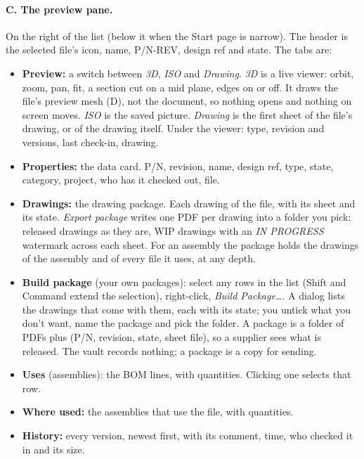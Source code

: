 \paragraph{C. The preview pane.} On the right of the list (below it when the Start page is narrow). The header is the
selected file's icon, name, P/N-REV, design ref and state. The tabs are:
\begin{itemize}[nosep]
  \item \textbf{Preview:} a switch between \emph{3D}, \emph{ISO} and \emph{Drawing}.
        \emph{3D} is a live viewer: orbit, zoom, pan, fit, a section cut on a mid plane, edges on or off. It draws
        the file's preview mesh (D), not the document, so nothing opens and nothing on screen moves. \emph{ISO} is the
        saved picture. \emph{Drawing} is the first sheet of the file's drawing, or of the drawing itself.
        Under the viewer: type, revision and versions, last check-in, drawing.
  \item \textbf{Properties:} the data card. P/N, revision, name, design ref, type, state, category, project, who
        has it checked out, file.
  \item \textbf{Drawings:} the drawing package. Each drawing of the file, with its sheet and its state. \emph{Export
        package} writes one PDF per drawing into a folder you pick: released drawings as they are, WIP drawings with an
        \emph{IN PROGRESS} watermark across each sheet. For an assembly the package holds the drawings of the assembly
        and of every file it uses, at any depth.
  \item \textbf{Build package} (your own packages): select any rows in the list (Shift and Command extend the
        selection), right-click, \emph{Build Package\ldots}. A dialog lists the drawings that come with them, each with
        its state; you untick what you don't want, name the package and pick the folder. A package is a folder of PDFs
        plus  (P/N, revision, state, sheet file), so a supplier sees what is released. The vault
        records nothing; a package is a copy for sending.
  \item \textbf{Uses} (assemblies): the BOM lines, with quantities. Clicking one selects that row.
  \item \textbf{Where used:} the assemblies that use the file, with quantities.
  \item \textbf{History:} every version, newest first, with its comment, time, who checked it in and its size.
\end{itemize}

